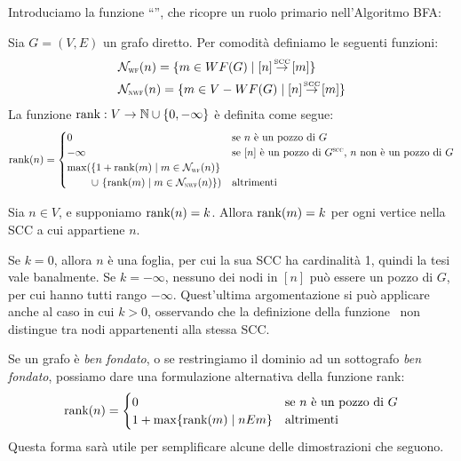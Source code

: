 Introduciamo la funzione ``\rankfunc'', che ricopre un ruolo primario nell'Algoritmo BFA:
\begin{definition}
    Sia $G = (V,E)$ un grafo diretto. Per comodità definiamo le seguenti funzioni:
    \begin{align*}
        &\mathcal{N}_{\scalebox{0.5}{WF}}(n) = \{m \in WF(G) \mid [n] \sccto [m]\}\\
        &\mathcal{N}_{\scalebox{0.5}{NWF}}(n) = \{m \in V - WF(G) \mid [n] \sccto [m]\}
    \end{align*}
    La funzione $\textup{rank}: V \to \mathbb{N} \cup \{0, -\infty\}$ è definita come segue:
    \begin{gather*}
        \rankfunc(n) = \begin{cases}
            0 &\text{se $n$ è un pozzo di $G$}\\
            -\infty &\text{se $[n]$ è un pozzo di $G^{\scalebox{.5}{SCC}}$, $n$ non è un pozzo di $G$}\\
            \max(\{1 + \rankfunc(m) \mid m \in \mathcal{N_{\scalebox{0.5}{WF}}}(n)\}\\
            \,\,\,\,\,\,\,\,\,\,\,\,\,\, \cup \,\, \{\rankfunc(m) \mid m \in \mathcal{N_{\scalebox{0.5}{NWF}}}(n)\}) &\text{altrimenti}
        \end{cases}
    \end{gather*}
\end{definition}
\begin{observation}
    Sia $n \in V$, e supponiamo $\textup{rank}(n) = k$. Allora $\textup{rank}(m) = k$ per ogni vertice nella SCC a cui appartiene $n$.
\end{observation}
\begin{proof2}
    Se $k = 0$, allora $n$ è una foglia, per cui la sua SCC ha cardinalità 1, quindi la tesi vale banalmente. Se $k = -\infty$, nessuno dei nodi in $[n]$ può essere un pozzo di $G$, per cui hanno tutti rango $-\infty$. Quest'ultima argomentazione si può applicare anche al caso in cui $k > 0$, osservando che la definizione della funzione \rankfunc \, non distingue tra nodi appartenenti alla stessa SCC.
\end{proof2}
Se un grafo è \emph{ben fondato}, o se restringiamo il dominio ad un sottografo \emph{ben fondato}, possiamo dare una formulazione alternativa della funzione rank:
\begin{gather*}
        \textup{rank}(n) = \begin{cases}
            0 &\text{se $n$ è un pozzo di $G$}\\
            1 + \max\{\textup{rank}(m) \mid n E m\} &\text{altrimenti}
        \end{cases}
\end{gather*}
Questa forma sarà utile per semplificare alcune delle dimostrazioni che seguono.


